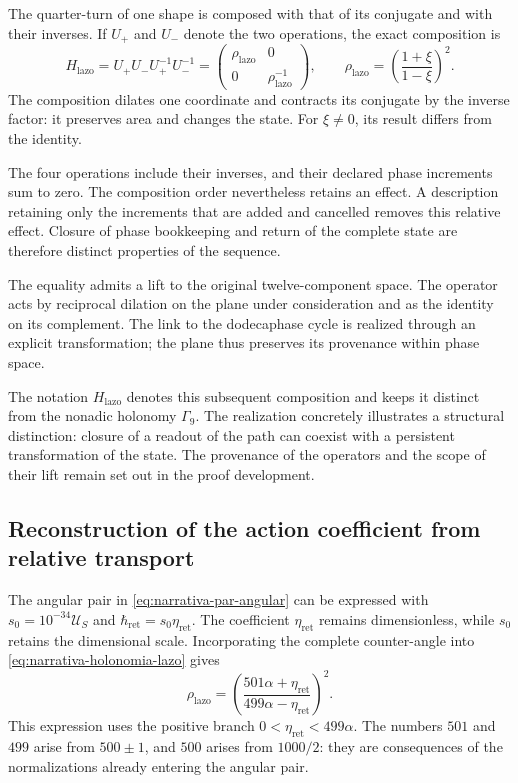 The quarter-turn of one shape is composed with that of its conjugate and with
their inverses. If $U_+$ and $U_-$ denote the two operations, the
exact composition is
\begin{equation}
 \boxed{
 H_{\mathrm{lazo}}=U_+U_-U_+^{-1}U_-^{-1}
 =\begin{pmatrix}\rho_{\mathrm{lazo}}&0\\[2pt]
                  0&\rho_{\mathrm{lazo}}^{-1}\end{pmatrix},
 \qquad
 \rho_{\mathrm{lazo}}=
 \left(\frac{1+\xi}{1-\xi}\right)^2.}
 \label{eq:narrativa-holonomia-lazo}
\end{equation}
The composition dilates one coordinate and contracts its conjugate by the
inverse factor: it preserves area and changes the state. For $\xi\ne0$, its
result differs from the identity.

The four operations include their inverses, and their declared phase
increments sum to zero. The composition order nevertheless retains an
effect. A description retaining only the increments that are added and
cancelled removes this relative effect. Closure of phase
bookkeeping and return of the complete state are therefore distinct
properties of the sequence.

The equality admits a lift to the original twelve-component
space. The operator acts by reciprocal dilation on the
plane under consideration and as the identity on its complement. The link to
the dodecaphase cycle is realized through an explicit transformation;
the plane thus preserves its provenance within phase space.

The notation $H_{\mathrm{lazo}}$ denotes this subsequent composition and
keeps it distinct from the nonadic holonomy $\Gamma_9$. The realization
concretely illustrates a structural distinction: closure of a
readout of the path can coexist with a persistent transformation
of the state. The provenance of the operators and the scope of their
lift remain set out in the proof development.

\subsection{Reconstruction of the action coefficient from relative transport}
\label{subsec:narrativa-restitucion-accion}

The angular pair in \eqref{eq:narrativa-par-angular} can be expressed with
$s_0=10^{-34}\mathcal U_S$ and
$\hbar_{\mathrm{ret}}=s_0\eta_{\mathrm{ret}}$. The coefficient
$\eta_{\mathrm{ret}}$ remains dimensionless, while $s_0$
retains the dimensional scale. Incorporating the complete counter-angle
into \eqref{eq:narrativa-holonomia-lazo} gives
\begin{equation}
 \boxed{
 \rho_{\mathrm{lazo}}=
 \left(\frac{501\alpha+\eta_{\mathrm{ret}}}
              {499\alpha-\eta_{\mathrm{ret}}}\right)^2.}
 \label{eq:narrativa-lazo-alfa-accion}
\end{equation}
This expression uses the positive branch
$0<\eta_{\mathrm{ret}}<499\alpha$. The numbers $501$ and $499$ arise
from $500\pm1$, and $500$ arises from $1000/2$: they are consequences of the
normalizations already entering the angular pair.

